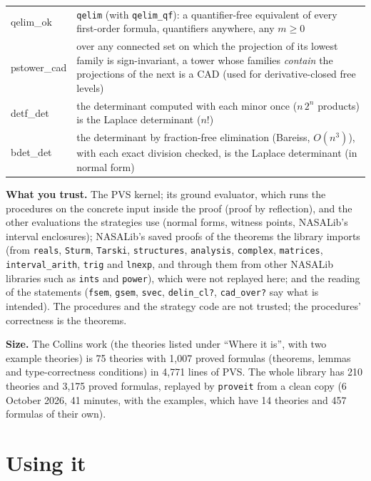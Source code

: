 \documentclass[11pt]{article}
\newcommand\code[1]{\mbox{\texttt{#1}}}
\begin{document}
{\begin{longtable}{@{}>{\ttfamily}p{} p{}@{}}
qelim\_ok & \texttt{qelim} (with \texttt{qelim\_qf}): a quantifier-free equivalent of every first-order formula, quantifiers anywhere, any $m \ge 0$\\
pstower\_cad & over any connected set on which the projection of its lowest family is sign-invariant, a tower whose families \emph{contain} the projections of the next is a CAD (used for derivative-closed free levels)\\
detf\_det & the determinant computed with each minor once ($n\,2^n$ products) is the Laplace determinant ($n!$)\\
bdet\_det & the determinant by fraction-free elimination (Bareiss, $O(n^3)$), with each exact division checked, is the Laplace determinant (in normal form)\\
\bottomrule
\end{longtable}}

\textbf{What you trust.} The PVS kernel; its ground evaluator, which runs the procedures on the concrete input
inside the proof (proof by reflection), and the other evaluations the strategies use (normal forms, witness points,
NASALib's interval enclosures); NASALib's saved proofs of the theorems the library imports (from
\texttt{reals}, \texttt{Sturm}, \texttt{Tarski}, \texttt{structures}, \texttt{analysis}, \texttt{complex},
\texttt{matrices}, \texttt{interval\_arith}, \texttt{trig} and \texttt{lnexp}, and through them
from other NASALib libraries such as \texttt{ints} and \texttt{power}), which were not replayed here; and the reading
of the statements (\code{fsem}, \code{gsem}, \code{svec}, \code{delin\_cl?}, \code{cad\_over?} say what is
intended). The procedures and the strategy code are not trusted; the procedures' correctness is the theorems.

\textbf{Size.} The Collins work (the theories listed under ``Where it is'', with two example theories) is 75
theories with 1,007 proved formulas (theorems, lemmas and type-correctness conditions) in 4,771 lines of PVS. The
whole library has 210 theories and 3,175 proved formulas, replayed by \texttt{proveit} from a clean copy
(6 October 2026, 41 minutes, with the examples, which have 14 theories and 457 formulas of their own).

\section{Using it}
\end{document}

